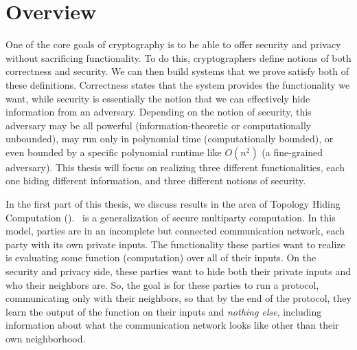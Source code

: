 \section{Overview}

One of the core goals of cryptography is to be able to offer security and privacy without sacrificing functionality.
To do this, cryptographers define notions of both correctness and security. We can then build systems that we prove satisfy both of these definitions. Correctness states that the system provides the functionality we want, while security is essentially the notion that we can effectively hide information from an adversary. Depending on the notion of security, this adversary may be all powerful (information-theoretic or computationally unbounded), may run only in polynomial time (computationally bounded), or even bounded by a specific polynomial runtime like $O(n^2)$ (a fine-grained adversary). This thesis will focus on realizing three different functionalities, each one hiding different information, and three different notions of security.



In the first part of this thesis, we discuss results in the area of Topology Hiding Computation (\THC). \THC~is a generalization of secure multiparty computation. In this model, parties are in an incomplete but connected communication network, each party with its own private inputs. The functionality these parties want to realize is evaluating some function (computation) over all of their inputs. On the security and privacy side, these parties want to hide both their private inputs and who their neighbors are.
So, the goal is for these parties to run a protocol, communicating only with their neighbors, so that by the end of the protocol, they learn the output of the function on their inputs and \emph{nothing else}, including information about what the communication network looks like other than their own neighborhood.

